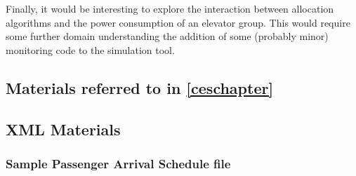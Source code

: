 \documentclass{UoYCSproject}
\begin{document}
Finally, it would be interesting to explore the interaction between allocation algorithms and the power consumption of an elevator group.  This would require some further domain understanding the addition  of some (probably minor) monitoring code to the simulation tool.



\appendix
\begin{appendices}

\chapter{Materials referred to in \autoref{ceschapter}}

\section{XML Materials}

\subsection{Sample Passenger Arrival Schedule file}


\end{appendices}
\end{document}
